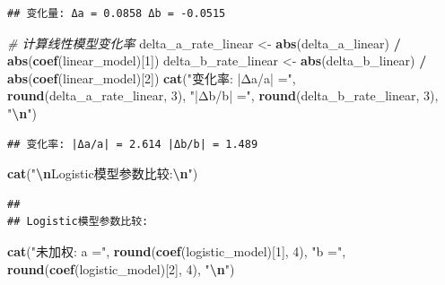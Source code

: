 \documentclass[
]{article}
\newenvironment{Shaded}{\begin{snugshade}}{\end{snugshade}}
\newcommand{\CommentTok}[1]{\textcolor[rgb]{0.56,0.35,0.01}{\textit{#1}}}
\newcommand{\DecValTok}[1]{\textcolor[rgb]{0.00,0.00,0.81}{#1}}
\newcommand{\FunctionTok}[1]{\textcolor[rgb]{0.13,0.29,0.53}{\textbf{#1}}}
\newcommand{\NormalTok}[1]{#1}
\newcommand{\OtherTok}[1]{\textcolor[rgb]{0.56,0.35,0.01}{#1}}
\newcommand{\SpecialCharTok}[1]{\textcolor[rgb]{0.81,0.36,0.00}{\textbf{#1}}}
\newcommand{\StringTok}[1]{\textcolor[rgb]{0.31,0.60,0.02}{#1}}
\begin{document}
\begin{verbatim}
## 变化量: Δa = 0.0858 Δb = -0.0515
\end{verbatim}

\begin{Shaded}
\begin{Highlighting}[]
\CommentTok{\# 计算线性模型变化率}
\NormalTok{delta\_a\_rate\_linear }\OtherTok{\textless{}{-}} \FunctionTok{abs}\NormalTok{(delta\_a\_linear) }\SpecialCharTok{/} \FunctionTok{abs}\NormalTok{(}\FunctionTok{coef}\NormalTok{(linear\_model)[}\DecValTok{1}\NormalTok{])}
\NormalTok{delta\_b\_rate\_linear }\OtherTok{\textless{}{-}} \FunctionTok{abs}\NormalTok{(delta\_b\_linear) }\SpecialCharTok{/} \FunctionTok{abs}\NormalTok{(}\FunctionTok{coef}\NormalTok{(linear\_model)[}\DecValTok{2}\NormalTok{])}
\FunctionTok{cat}\NormalTok{(}\StringTok{"变化率: |Δa/a| ="}\NormalTok{, }\FunctionTok{round}\NormalTok{(delta\_a\_rate\_linear, }\DecValTok{3}\NormalTok{), }\StringTok{"|Δb/b| ="}\NormalTok{, }\FunctionTok{round}\NormalTok{(delta\_b\_rate\_linear, }\DecValTok{3}\NormalTok{), }\StringTok{"}\SpecialCharTok{\textbackslash{}n}\StringTok{"}\NormalTok{)}
\end{Highlighting}
\end{Shaded}

\begin{verbatim}
## 变化率: |Δa/a| = 2.614 |Δb/b| = 1.489
\end{verbatim}

\begin{Shaded}
\begin{Highlighting}[]
\FunctionTok{cat}\NormalTok{(}\StringTok{"}\SpecialCharTok{\textbackslash{}n}\StringTok{Logistic模型参数比较:}\SpecialCharTok{\textbackslash{}n}\StringTok{"}\NormalTok{)}
\end{Highlighting}
\end{Shaded}

\begin{verbatim}
## 
## Logistic模型参数比较:
\end{verbatim}

\begin{Shaded}
\begin{Highlighting}[]
\FunctionTok{cat}\NormalTok{(}\StringTok{"未加权: a ="}\NormalTok{, }\FunctionTok{round}\NormalTok{(}\FunctionTok{coef}\NormalTok{(logistic\_model)[}\DecValTok{1}\NormalTok{], }\DecValTok{4}\NormalTok{), }\StringTok{"b ="}\NormalTok{, }\FunctionTok{round}\NormalTok{(}\FunctionTok{coef}\NormalTok{(logistic\_model)[}\DecValTok{2}\NormalTok{], }\DecValTok{4}\NormalTok{), }\StringTok{"}\SpecialCharTok{\textbackslash{}n}\StringTok{"}\NormalTok{)}
\end{Highlighting}
\end{Shaded}
\end{document}
